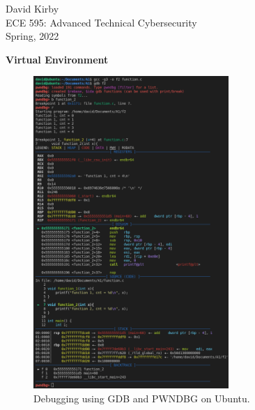 \documentclass[12pt]{article}
\begin{document}
\setmainfont{SF Pro Text}
\setsansfont{SF Pro Text}
\setmonofont{SF Mono}
\renewcommand{\familydefault}{\sfdefault}

\hypersetup{
    linkcolor=CrispBlue,
    urlcolor=CrispBlue,
    breaklinks=true
}

\noindent David Kirby\\
ECE 595: Advanced Technical Cybersecurity\\
Spring, 2022
\begin{center}
    \large\bfseries Virtual Environment
\end{center}

\begin{figure}[!ht]
    \centering
    \includegraphics[width=0.66\textwidth]{figure03.png}
    \caption{Debugging using GDB and PWNDBG on Ubuntu.}
    \label{fig:login}
\end{figure}


\end{document}
